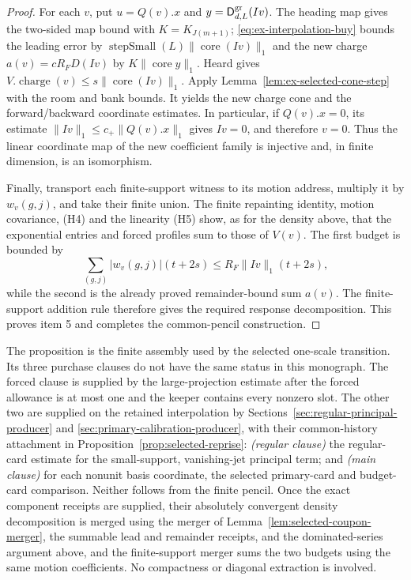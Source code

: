 \begin{proof}
For each $v$, put $u=Q(v).x$ and $y=\mathsf D^{\rm gr}_{d,L}(Iv)$.
The heading map gives the two-sided map bound with $K=K_{J(m+1)}$;
\eqref{eq:ex-interpolation-buy} bounds the leading error by
$\operatorname{stepSmall}(L)\|\operatorname{core}(Iv)\|_1$ and the
new charge $a(v)=cR_FD(Iv)$ by $K\|\operatorname{core}y\|_1$.
Heard gives $V.\operatorname{charge}(v)\le s\|\operatorname{core}(Iv)\|_1$.
Apply Lemma~\ref{lem:ex-selected-cone-step} with the room and bank bounds.
It yields the new charge cone and the forward/backward coordinate
estimates. In particular, if $Q(v).x=0$, its estimate
$\|Iv\|_1\le c_+\|Q(v).x\|_1$ gives $Iv=0$, and therefore $v=0$.
Thus the linear coordinate map of the new coefficient family is injective and, in finite
dimension, is an isomorphism.

Finally, transport each finite-support witness to its motion address, multiply
it by $w_v(g,j)$, and take their finite union. The finite repainting identity, motion covariance, (H4) and the linearity
(H5) show, as for the density above, that the exponential entries and forced
profiles sum to those of $V(v)$. The first budget is bounded by
\[
 \sum_{(g,j)}|w_v(g,j)|(t+2s)
       \le R_F\|Iv\|_1(t+2s),
\]
while the second is the already proved remainder-bound sum $a(v)$. The
finite-support addition rule therefore gives the required response decomposition. This
proves item 5 and completes the common-pencil construction.
\end{proof}

The proposition is the finite assembly used by the selected one-scale
transition. Its three purchase clauses do not have the same status in this
monograph. The forced clause is supplied by the large-projection estimate
after the forced allowance is at most one and the keeper contains every
nonzero slot. The other two are supplied on the retained interpolation by
Sections~\ref{sec:regular-principal-producer} and
\ref{sec:primary-calibration-producer}, with their common-history attachment
in Proposition~\ref{prop:selected-reprise}:
\emph{(regular clause)} the regular-card estimate for the small-support,
vanishing-jet principal term; and \emph{(main clause)} for each nonunit
basis coordinate, the selected primary-card and budget-card comparison.
Neither follows from the finite pencil. Once the exact component receipts are supplied, their absolutely
convergent density decomposition is merged using the merger of Lemma~\ref{lem:selected-coupon-merger},
the summable lead and remainder receipts, and the dominated-series argument
above, and the finite-support merger sums the two budgets using the same motion
coefficients. No compactness or diagonal extraction is involved.

